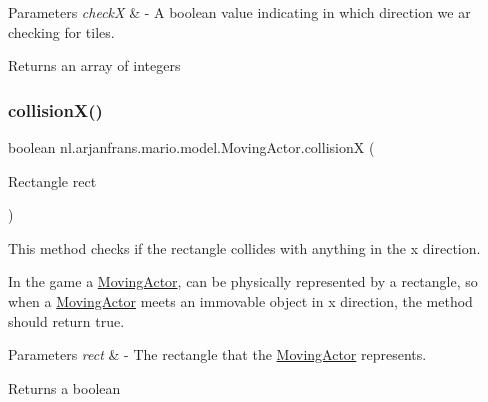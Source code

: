\begin{DoxyParams}{Parameters}
{\em checkX} & -\/ A boolean value indicating in which direction we ar checking for tiles. \\
\hline
\end{DoxyParams}
\begin{DoxyReturn}{Returns}
an array of integers 
\end{DoxyReturn}
\mbox{\label{classnl_1_1arjanfrans_1_1mario_1_1model_1_1MovingActor_a58d1642a39909c7f838dd84b2fb6c506}} 
\subsubsection{\texorpdfstring{collision\+X()}{collisionX()}}
{\footnotesize\ttfamily boolean nl.\+arjanfrans.\+mario.\+model.\+Moving\+Actor.\+collisionX (\begin{DoxyParamCaption}\item[{Rectangle}]{rect }\end{DoxyParamCaption})\hspace{0.3cm}{\ttfamily [protected]}}



This method checks if the rectangle collides with anything in the x direction. 

In the game a \hyperlink{classnl_1_1arjanfrans_1_1mario_1_1model_1_1MovingActor}{Moving\+Actor}, can be physically represented by a rectangle, so when a \hyperlink{classnl_1_1arjanfrans_1_1mario_1_1model_1_1MovingActor}{Moving\+Actor} meets an immovable object in x direction, the method should return true. 
\begin{DoxyParams}{Parameters}
{\em rect} & -\/ The rectangle that the \hyperlink{classnl_1_1arjanfrans_1_1mario_1_1model_1_1MovingActor}{Moving\+Actor} represents. \\
\hline
\end{DoxyParams}
\begin{DoxyReturn}{Returns}
a boolean 
\end{DoxyReturn}
\mbox{\label{classnl_1_1arjanfrans_1_1mario_1_1model_1_1MovingActor_acd9c3910d87bd94574b28599b7bc89db}} 
